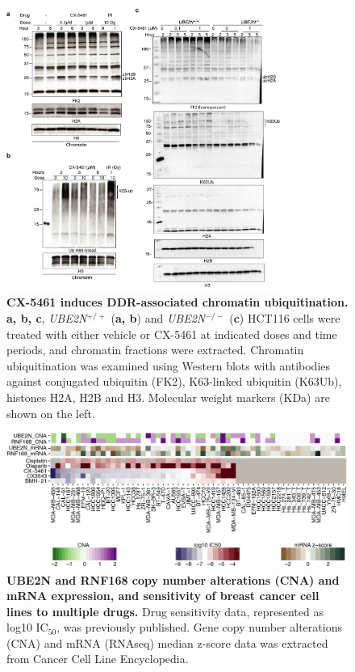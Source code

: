 \begin{figure}
    \centering
    \includegraphics[width=0.8\textwidth]{supplement/figures/chromatin_ub_westerns}
    \caption[CX-5461-induced chromatin ubiquitination]
            {\small{\textbf{CX-5461 induces DDR-associated chromatin ubiquitination.}}
            \textbf{a, b, c}, \textit{UBE2N$^{+/+}$} (\textbf{a, b}) and \textit{UBE2N$^{-/-}$} (\textbf{c}) HCT116 cells were treated with either vehicle or CX-5461 at indicated doses and time periods, and chromatin fractions were extracted. Chromatin ubiquitination was examined using Western blots with antibodies against conjugated ubiquitin (FK2), K63-linked ubiquitin (K63Ub), histones H2A, H2B and H3. Molecular weight markers (KDa) are shown on the left. 
            }
        \label{sfig:chromatin_ub_westerns}
\end{figure}

\begin{figure}
    \centering
    \includegraphics[width=1\textwidth]{supplement/figures/cell_lines_sensitivity.png}
    \caption[Sensitivity of breast cancer cell lines to CX-5461]
            {\small{\textbf{UBE2N and RNF168 copy number alterations (CNA) and mRNA expression, and sensitivity of breast cancer cell lines to multiple drugs.}}
            Drug sensitivity data, represented as log10 IC$_{50}$, was previously published\cite{Xu2017}. Gene copy number alterations (CNA) and mRNA (RNAseq) median z-score data was extracted from Cancer Cell Line Encyclopedia\cite{Barretina2012}.  
            }
        \label{sfig:cell_line_sensitivity}
\end{figure}


